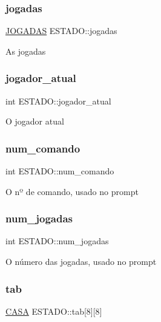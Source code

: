 \subsubsection{\texorpdfstring{jogadas}{jogadas}}
{\footnotesize\ttfamily \hyperlink{camadadados_8h_a94c221d29a1760f008b7834093259b7d}{J\+O\+G\+A\+D\+AS} E\+S\+T\+A\+D\+O\+::jogadas}

As jogadas \mbox{\label{structESTADO_a5dd28e2e68b7aef2b6b7ea88e02eff58}} 
\subsubsection{\texorpdfstring{jogador\+\_\+atual}{jogador\_atual}}
{\footnotesize\ttfamily int E\+S\+T\+A\+D\+O\+::jogador\+\_\+atual}

O jogador atual \mbox{\label{structESTADO_adf1064dfc09145b6995a7897249f1674}} 
\subsubsection{\texorpdfstring{num\+\_\+comando}{num\_comando}}
{\footnotesize\ttfamily int E\+S\+T\+A\+D\+O\+::num\+\_\+comando}

O nº de comando, usado no prompt \mbox{\label{structESTADO_a261495728744647e618b4e623f5a4b7a}} 
\subsubsection{\texorpdfstring{num\+\_\+jogadas}{num\_jogadas}}
{\footnotesize\ttfamily int E\+S\+T\+A\+D\+O\+::num\+\_\+jogadas}

O número das jogadas, usado no prompt \mbox{\label{structESTADO_ab56f0f1be16954d3768b4174d14c087d}} 
\subsubsection{\texorpdfstring{tab}{tab}}
{\footnotesize\ttfamily \hyperlink{camadadados_8h_aba91601f16d4c485b2d9b8c429f27039}{C\+A\+SA} E\+S\+T\+A\+D\+O\+::tab\mbox{[}8\mbox{]}\mbox{[}8\mbox{]}}

